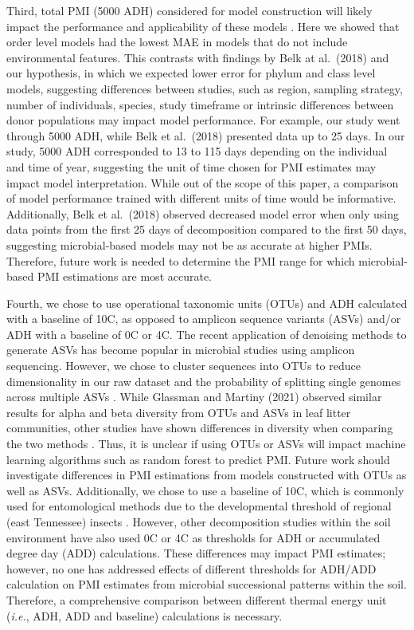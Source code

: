 \documentclass[
  10pt,
  letterpaper,
]{article}
\begin{document}
Third, total PMI (5000 ADH) considered for model construction will
likely impact the performance and applicability of these models
\citep{metcalf_estimating_2019}. Here we showed that order level models
had the lowest MAE in models that do not include environmental features.
This contrasts with findings by Belk at al.~(2018)
\citep{belk_microbiome_2018} and our hypothesis, in which we expected
lower error for phylum and class level models, suggesting differences
between studies, such as region, sampling strategy, number of
individuals, species, study timeframe or intrinsic differences between
donor populations may impact model performance. For example, our study
went through 5000 ADH, while Belk et al.~(2018)
\citep{belk_microbiome_2018} presented data up to 25 days. In our study,
5000 ADH corresponded to 13 to 115 days depending on the individual and
time of year, suggesting the unit of time chosen for PMI estimates may
impact model interpretation. While out of the scope of this paper, a
comparison of model performance trained with different units of time
would be informative. Additionally, Belk et al.~(2018)
\citep{belk_microbiome_2018} observed decreased model error when only
using data points from the first 25 days of decomposition compared to
the first 50 days, suggesting microbial-based models may not be as
accurate at higher PMIs. Therefore, future work is needed to determine
the PMI range for which microbial-based PMI estimations are most
accurate.

Fourth, we chose to use operational taxonomic units (OTUs) and ADH
calculated with a baseline of 10\textdegree C, as opposed to amplicon
sequence variants (ASVs) and/or ADH with a baseline of 0\textdegree C or
4\textdegree C. The recent application of denoising methods to generate
ASVs has become popular in microbial studies using amplicon sequencing.
However, we chose to cluster sequences into OTUs to reduce
dimensionality in our raw dataset and the probability of splitting
single genomes across multiple ASVs
\citep{patrick_d_schloss_amplicon_2021}. While Glassman and Martiny
(2021) \citep{glassman_broadscale_2018} observed similar results for
alpha and beta diversity from OTUs and ASVs in leaf litter communities,
other studies have shown differences in diversity when comparing the two
methods \citep{chiarello_ranking_2022}. Thus, it is unclear if using
OTUs or ASVs will impact machine learning algorithms such as random
forest to predict PMI. Future work should investigate differences in PMI
estimations from models constructed with OTUs as well as ASVs.
Additionally, we chose to use a baseline of 10\textdegree C, which is
commonly used for entomological methods due to the developmental
threshold of regional (east Tennessee) insects
\citep{byrd_development_2001}. However, other decomposition studies
within the soil environment have also used 0\textdegree C or
4\textdegree C as thresholds for ADH or accumulated degree day (ADD)
calculations. These differences may impact PMI estimates; however, no
one has addressed effects of different thresholds for ADH/ADD
calculation on PMI estimates from microbial successional patterns within
the soil. Therefore, a comprehensive comparison between different
thermal energy unit (\emph{i.e.}, ADH, ADD and baseline) calculations is
necessary.
\end{document}
